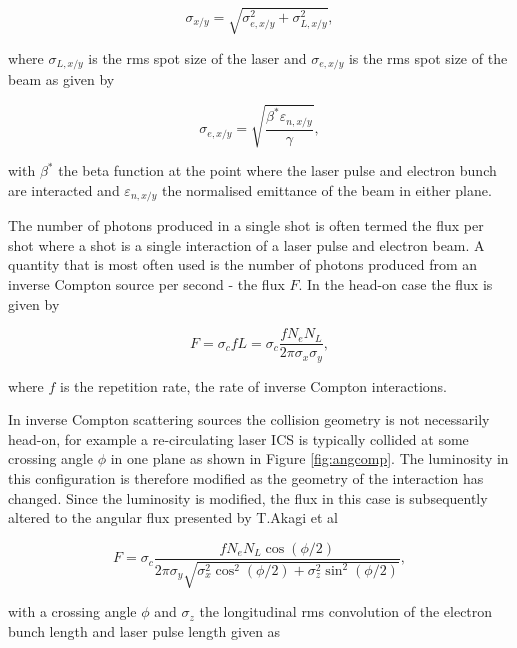 \documentclass[11pt]{article}
\begin{document}
\begin{equation}
\sigma_{x/y} = \sqrt{\sigma^{2}_{e, x/y} + \sigma^{2}_{L, x/y}},
\label{eq:convspot}
\end{equation}

\noindent where $\sigma_{L,x/y}$ is the rms spot size of the laser and $\sigma_{e,x/y}$ is the rms spot size of the beam as given by 

\begin{equation}    
\sigma_{e,x/y} = \sqrt{\frac{\beta^{*}\varepsilon_{n,x/y}}{\gamma}},
\label{eq:beamsize}
\end{equation}

\noindent with $\beta^{*}$ the beta function at the point where the laser pulse and electron bunch are interacted and $\varepsilon_{n,x/y}$ the normalised emittance of the beam in either plane.

The number of photons produced in a single shot is often termed the flux per shot where a shot is a single interaction of a laser pulse and electron beam.  A quantity that is most often used is the number of photons produced from an inverse Compton source per second - the flux $F$. In the head-on case the flux is given by

\begin{equation}
F = \sigma_{c}fL = \sigma_{c}\frac{fN_{e}N_{L}}{2\pi\sigma_{x}\sigma_{y}},
\label{eq:Fluxheadon}
\end{equation}

\noindent where $f$ is the repetition rate, the rate of inverse Compton interactions.

In inverse Compton scattering sources the collision geometry is not necessarily head-on, for example a re-circulating laser ICS is typically collided at some crossing angle $\phi$ in one plane as shown in Figure \ref{fig:angcomp}. The luminosity in this configuration is therefore modified as the geometry of the interaction has changed. Since the luminosity is modified, the flux in this case is subsequently altered to the angular flux presented by T.Akagi et al \cite{TAkagicERL}

\begin{equation}
F = \sigma_{c}\frac{fN_{e}N_{L}\cos\left(\phi/2\right)}{2\pi\sigma_{y}\sqrt{\sigma^{2}_{x}\cos^{2}\left(\phi/2\right)+\sigma^{2}_{z}\sin^{2}\left(\phi/2\right)}},
\label{eq:Fluxang}
\end{equation}

\noindent with a crossing angle $\phi$ and $\sigma_{z}$ the longitudinal rms convolution of the electron bunch length and laser pulse length given as
\end{document}

